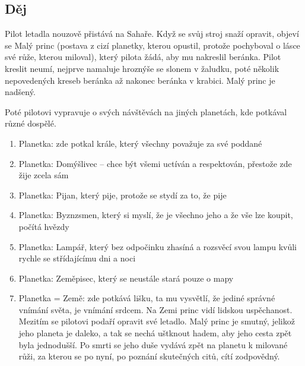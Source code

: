 \subsection*{Děj}
Pilot letadla nouzově přistává na Sahaře.
Když se svůj stroj snaží opravit, objeví se Malý princ (postava z cizí planetky, kterou opustil, protože pochyboval o lásce své růže, kterou miloval), který pilota žádá, aby mu nakreslil beránka.
Pilot kreslit neumí, nejprve namaluje hroznýše se slonem v žaludku, poté několik nepovedených kreseb beránka až nakonec beránka v krabici.
Malý princ je nadšený.

Poté pilotovi vypravuje o svých návštěvách na jiných planetách, kde potkával různé dospělé.
\begin{enumerate}
    \itemsep-0.5em
    \item Planetka: zde potkal krále, který všechny považuje za své poddané
    \item Planetka: Domýšlivec – chce být všemi uctíván a respektován, přestože zde žije zcela sám
    \item Planetka: Pijan, který pije, protože se stydí za to, že pije
    \item Planetka: Byznzsmen, který si myslí, že je všechno jeho a že vše lze koupit, počítá hvězdy
    \item Planetka: Lampář, který bez odpočinku zhasíná a rozsvěcí svou lampu kvůli rychle se střídajícímu dni a noci
    \item Planetka: Zeměpisec, který se neustále stará pouze o mapy
    \item Planetka = Země: zde potkává lišku, ta mu vysvětlí, že jediné správné vnímání světa, je vnímání srdcem.
          Na Zemi princ vidí lidskou uspěchanost.
          Mezitím se pilotovi podaří opravit své letadlo.
          Malý princ je smutný, jelikož jeho planeta je daleko, a tak se nechá uštknout hadem, aby jeho cesta zpět byla jednodušší.
          Po smrti se jeho duše vydává zpět na planetu k milované růži, za kterou se po nyní, po poznání skutečných citů, cítí zodpovědný.
\end{enumerate}


